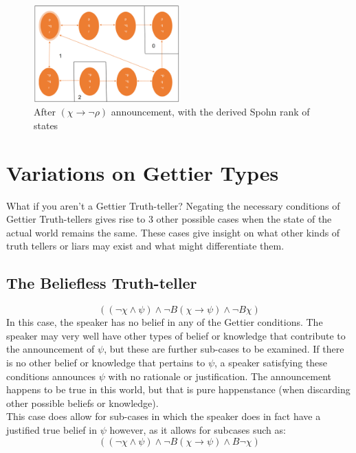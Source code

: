 \documentclass[12pt, titlepage, twoside]{report}
\begin{document}
\begin{figure}[h]
  \centering
  \includegraphics[width=0.5\textwidth]{slide21.eps}
  \caption{After $(\chi \to \neg \rho)$ announcement, with the derived Spohn rank of states}
\end{figure}

\chapter{Variations on Gettier Types}
What if you aren't a Gettier Truth-teller? Negating the necessary conditions of Gettier Truth-tellers gives rise to 3 other possible cases when the state of the actual world remains the same. These cases give insight on what other kinds of truth tellers or liars may exist and what might differentiate them.

\section{The Beliefless Truth-teller}
$$((\neg \chi \wedge \psi) \wedge \neg B(\chi \to \psi) \wedge \neg B \chi)$$
In this case, the speaker has no belief in any of the Gettier conditions. The speaker may very well have other types of belief or knowledge that contribute to the announcement of $\psi$, but these are further sub-cases to be examined. If there is no other belief or knowledge that pertains to $\psi$, a speaker satisfying these conditions announces $\psi$ with no rationale or justification. The announcement happens to be true in this world, but that is pure happenstance (when discarding other possible beliefs or knowledge).\\
This case does allow for sub-cases in which the speaker does in fact have a justified true belief in $\psi$ however, as it allows for subcases such as:
$$((\neg \chi \wedge \psi) \wedge \neg B(\chi \to \psi) \wedge B \neg \chi)$$
\end{document}
